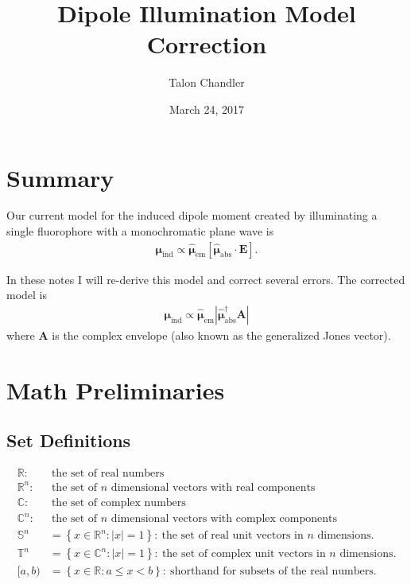 \documentclass[11pt]{article}
\providecommand{\mb}[1]{\mathbf{#1}}
\providecommand{\bs}[1]{\boldsymbol{#1}}
\begin{document}
\title{\vspace{-2.5em}Dipole Illumination Model Correction\vspace{-1em}}
\author{Talon Chandler}%
\date{\vspace{-1em}March 24, 2017\vspace{-1em}}
\maketitle

\section{Summary}
Our current model for the induced dipole moment created by illuminating a single
fluorophore with a monochromatic plane wave is
\begin{align}
  \bs{\mu}_{\text{ind}} \propto \hat{\bs{\mu}}_{\text{em}} \left[\hat{\bs{\mu}}_{\text{abs}}\cdot \mb{E}\right].
\end{align}

In these notes I will re-derive this model and correct several errors. The corrected
model is
\begin{align}
  \bs{\mu}_{\text{ind}} \propto \hat{\bs{\mu}}_{\text{em}} \left|\hat{\bs{\mu}}_{\text{abs}}^{\dagger}\mb{A}\right|
\end{align}
where $\mb{A}$ is the complex envelope (also known as the generalized Jones
vector).

\section{Math Preliminaries}
\subsection{Set Definitions}
\begin{align*}
  \mathbb{R}:&\ \text{the set of real numbers}\\
  \mathbb{R}^n:&\ \text{the set of $n$ dimensional vectors with real components}\\
  \mathbb{C}:&\ \text{the set of complex numbers}\\
  \mathbb{C}^n:&\ \text{the set of $n$ dimensional vectors with complex components}\\
  \mathbb{S}^n &= \left\{x\in \mathbb{R}^{n}: |x| = 1 \right\}:\ \text{the set of real unit vectors in $n$ dimensions.}\\
  \mathbb{T}^n &= \left\{x\in \mathbb{C}^{n}: |x| = 1 \right\}:\ \text{the set of complex unit vectors in $n$ dimensions.}\\
  [a, b) &= \left\{x\in \mathbb{R}: a\leq x < b\right\}:\ \text{shorthand for subsets of the real numbers. }
\end{align*}
\end{document}
